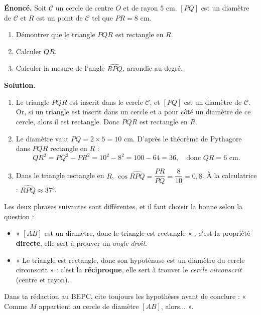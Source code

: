 \documentclass[11pt]{article}
\begin{document}
\begin{exoresolu}
\textbf{Énoncé.} Soit $\mathcal{C}$ un cercle de centre $O$ et de rayon $5$ cm. $[PQ]$ est un diamètre de $\mathcal{C}$ et $R$ est un point de $\mathcal{C}$ tel que $PR = 8$ cm.
\begin{enumerate}
  \item Démontrer que le triangle $PQR$ est rectangle en $R$.
  \item Calculer $QR$.
  \item Calculer la mesure de l'angle $\widehat{RPQ}$, arrondie au degré.
\end{enumerate}
\tcblower
\textbf{Solution.}
\begin{enumerate}
  \item Le triangle $PQR$ est inscrit dans le cercle $\mathcal{C}$, et $[PQ]$ est un diamètre de $\mathcal{C}$. Or, si un triangle est inscrit dans un cercle et a pour côté un diamètre de ce cercle, alors il est rectangle. Donc $PQR$ est rectangle en $R$.
  \item Le diamètre vaut $PQ = 2 \times 5 = 10$ cm. D'après le théorème de Pythagore dans $PQR$ rectangle en $R$ :
  \[ QR^2 = PQ^2 - PR^2 = 10^2 - 8^2 = 100 - 64 = 36, \quad \text{donc } QR = 6 \text{ cm}. \]
  \item Dans le triangle rectangle en $R$, $\cos\widehat{RPQ} = \dfrac{PR}{PQ} = \dfrac{8}{10} = 0{,}8$. À la calculatrice : $\widehat{RPQ} \approx 37°$.
\end{enumerate}
\end{exoresolu}

\begin{attention}
Les deux phrases suivantes sont différentes, et il faut choisir la bonne selon la question :
\begin{itemize}
  \item « $[AB]$ est un diamètre, donc le triangle est rectangle » : c'est la propriété \textbf{directe}, elle sert à prouver un \emph{angle droit}.
  \item « Le triangle est rectangle, donc son hypoténuse est un diamètre du cercle circonscrit » : c'est la \textbf{réciproque}, elle sert à trouver le \emph{cercle circonscrit} (centre et rayon).
\end{itemize}
Dans ta rédaction au BEPC, cite toujours les hypothèses avant de conclure : « Comme $M$ appartient au cercle de diamètre $[AB]$, alors... ».
\end{attention}
\end{document}
